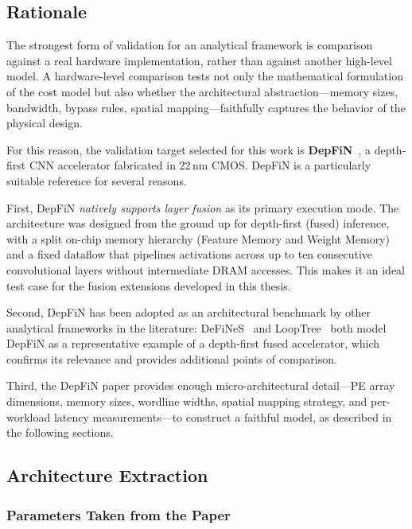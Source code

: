 \subsection{Rationale}
\label{sec:val-rationale}

The strongest form of validation for an analytical framework is
comparison against a real hardware implementation, rather than against
another high-level model.
A hardware-level comparison tests not only the mathematical formulation
of the cost model but also whether the architectural abstraction---memory
sizes, bandwidth, bypass rules, spatial mapping---faithfully captures the
behavior of the physical design.

For this reason, the validation target selected for this work is
\textbf{DepFiN}~\cite{goetschalckx2023depfin}, a depth-first CNN
accelerator fabricated in 22\,nm CMOS.
DepFiN is a particularly suitable reference for several reasons.

First, DepFiN \emph{natively supports layer fusion} as its primary
execution mode.
The architecture was designed from the ground up for depth-first
(fused) inference, with a split on-chip memory hierarchy (Feature
Memory and Weight Memory) and a fixed dataflow that pipelines
activations across up to ten consecutive convolutional layers without
intermediate DRAM accesses.
This makes it an ideal test case for the fusion extensions developed
in this thesis.

Second, DepFiN has been adopted as an architectural benchmark by
other analytical frameworks in the literature: DeFiNeS~\cite{defines}
and LoopTree~\cite{looptree} both model DepFiN as a representative
example of a depth-first fused accelerator, which confirms its
relevance and provides additional points of comparison.

Third, the DepFiN paper provides enough micro-architectural detail---PE
array dimensions, memory sizes, wordline widths, spatial mapping
strategy, and per-workload latency measurements---to construct a
faithful model, as described in the following sections.


\subsection{Architecture Extraction}
\label{sec:val-arch-extraction}

\subsubsection{Parameters Taken from the Paper}

